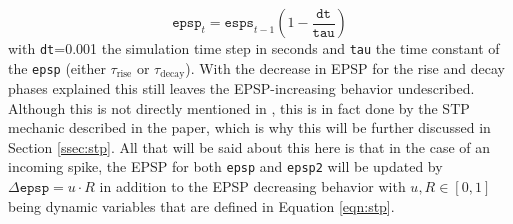 \begin{equation}
    \texttt{epsp}_t=\texttt{esps}_{t-1} \left(1-\frac{\texttt{dt}}{\texttt{tau}} \right)
    \label{eqn:epsp_update}
\end{equation}
with \texttt{dt}=0.001 the simulation time step in seconds and \texttt{tau} the time constant of the \texttt{epsp} (either $\tau_{\text{rise}}$ or $\tau_{\text{decay}}$). With the decrease in EPSP for the rise and decay phases explained this still leaves the EPSP-increasing behavior undescribed. Although this is not directly mentioned in \parencite{klampfl_maass_2013}, this is in fact done by the STP mechanic described in the paper, which is why this will be further discussed in Section \ref{ssec:stp}. All that will be said about this here is that in the case of an incoming spike, the EPSP for both \texttt{epsp} and \texttt{epsp2} will be updated by $\Delta \texttt{epsp}=u\cdot R$ in addition to the EPSP decreasing behavior with $u,R\in[0,1]$ being dynamic variables that are defined in Equation \ref{eqn:stp}. 


